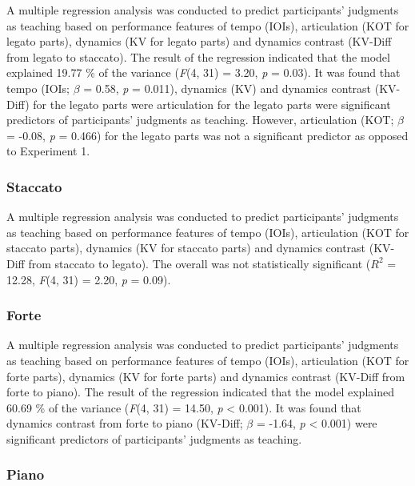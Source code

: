 \documentclass[
  man,floatsintext]{apa6}
\begin{document}
A multiple regression analysis was conducted to predict participants' judgments as teaching based on performance features of tempo (IOIs), articulation (KOT for legato parts), dynamics (KV for legato parts) and dynamics contrast (KV-Diff from legato to staccato). The result of the regression indicated that the model explained 19.77 \% of the variance (\emph{F}(4, 31) = 3.20, \emph{p} = 0.03). It was found that tempo (IOIs; \emph{\(\beta\)} = 0.58, \emph{p} = 0.011), dynamics (KV) and dynamics contrast (KV-Diff) for the legato parts were articulation for the legato parts were significant predictors of participants' judgments as teaching. However, articulation (KOT; \emph{\(\beta\)} = -0.08, \emph{p} = 0.466) for the legato parts was not a significant predictor as opposed to Experiment 1.

\hypertarget{staccato-1}{%
\subsubsection{Staccato}\label{staccato-1}}

A multiple regression analysis was conducted to predict participants' judgments as teaching based on performance features of tempo (IOIs), articulation (KOT for staccato parts), dynamics (KV for staccato parts) and dynamics contrast (KV-Diff from staccato to legato). The overall was not statistically significant (\(R^{2}\) = 12.28, \emph{F}(4, 31) = 2.20, \emph{p} = 0.09).

\hypertarget{forte-1}{%
\subsubsection{Forte}\label{forte-1}}

A multiple regression analysis was conducted to predict participants' judgments as teaching based on performance features of tempo (IOIs), articulation (KOT for forte parts), dynamics (KV for forte parts) and dynamics contrast (KV-Diff from forte to piano). The result of the regression indicated that the model explained 60.69 \% of the variance (\emph{F}(4, 31) = 14.50, \emph{p} \textless{} 0.001). It was found that dynamics contrast from forte to piano (KV-Diff; \emph{\(\beta\)} = -1.64, \emph{p} \textless{} 0.001) were significant predictors of participants' judgments as teaching.

\hypertarget{piano-1}{%
\subsubsection{Piano}\label{piano-1}}
\end{document}
